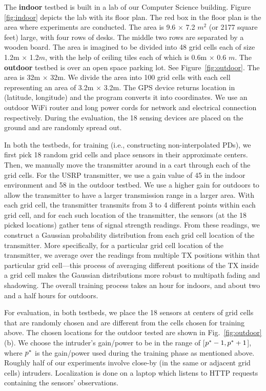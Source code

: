  The {\bf indoor} testbed is built in a lab of our
Computer Science building.  Figure \ref{fig:indoor} depicts the lab
with its floor plan. The red box in the floor plan is the area where
experiments are conducted. The area is 9.6 $\times$ 7.2 $m^2$ (or 2177
square feet) large, with four rows of desks. The middle two rows
are separated by a wooden board. The area is imagined to be divided
into 48 grid cells each of size 1.2m $\times$ 1.2$m$, with the help of
ceiling tiles each of which is 0.6m $\times$ 0.6 $m$. 
The {\bf outdoor} testbed is over an open space parking lot.  See
Figure~\ref{fig:outdoor}. The area is 32m $\times$ 32m. We divide the
area into 100 grid cells with each cell representing an area of 3.2m
$\times$ 3.2m. The GPS device returns location in (latitude,
longitude) and the program converts it into coordinates. We use an
outdoor WiFi router and long power cords for network and electrical
connection respectively.
During the evaluation, the 18 sensing devices are placed on the ground
and are randomly spread out.


 In both the testbeds, for training (i.e.,
constructing non-interpolated PDs), we first pick 18 random grid cells
and place sensors in their approximate centers. Then, we manually move
the transmitter around in a cart through each of the grid cells. For
the USRP transmitter, we use a gain value of 45 in the indoor
environment and 58 in the outdoor testbed. We use a higher gain for
outdoors to allow the transmitter to have a larger transmission range
in a larger area.
With each grid cell, the transmitter transmits from 3 to 4 different
points within each grid cell, and for each such location of the
transmitter, the sensors (at the 18 picked locations) gather tens of
signal strength readings. From these readings, we construct a Gaussian
probability distribution from each grid cell location of the
transmitter.
More specifically, for a particular grid cell location of the
transmitter, we average over the readings from multiple TX positions
within that particular grid cell---this process of averaging different
positions of the TX inside a grid cell makes the Gaussian
distributions more robust to multipath fading and shadowing. The
overall training process takes an hour for indoors, and about two and
a half hours for outdoors.

  For evaluation, in both testbeds, we place the 18
sensors at centers of grid cells that are randomly chosen and are
different from the cells chosen for training above. The chosen
locations for the outdoor tested are shown in
Fig.~\ref{fig:outdoor}(b). We choose the intruder's gain/power to be
in the range of [$p^*-1, p^*+1$], where $p^*$ is the
gain/power used during the training phase as mentioned above.
Roughly half of our experiments involve close-by (in the same or
adjacent grid cells) intruders. Localization is done on a laptop which
listens to HTTP requests containing the sensors' observations. 

